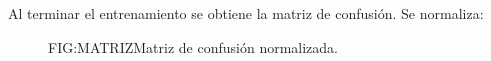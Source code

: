 Al terminar el entrenamiento se obtiene la matriz de confusión. Se normaliza:

\begin{figure}{FIG:MATRIZ}{Matriz de confusión normalizada.}
\end{figure}